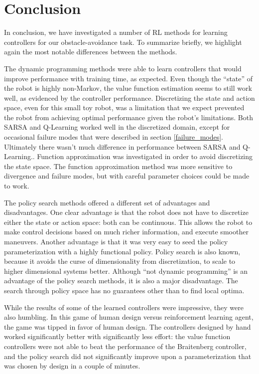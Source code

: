 \documentclass{article}
\begin{document}
\section{Conclusion}

In conclusion, we have investigated a number of RL methods for learning controllers for our obstacle-avoidance task.  To summarize briefly, we highlight again the most notable differences between the methods.

The dynamic programming methods were able to learn controllers that would improve performance with training time, as expected.  Even though the ``state'' of the robot is highly non-Markov, the value function estimation seems to still work well, as evidenced by the controller performance.  Discretizing the state and action space, even for this small toy robot, was a limitation that we expect prevented the robot from achieving optimal performance given the robot's limitations. Both SARSA and Q-Learning worked well in the discretized domain, except for occasional failure modes that were described in section \ref{failure_modes}. Ultimately there wasn't much difference in performance between SARSA and Q-Learning.. Function approximation was investigated in order to avoid discretizing the state space. The function approximation method was more sensitive to divergence and failure modes, but with careful parameter choices could be made to work.

The policy search methods offered a different set of advantages and disadvantages.  One clear advantage is that the robot does not have to discretize either the state or action space: both can be continuous.  This allows the robot to make control decisions based on much richer information, and execute smoother maneuvers.  Another advantage is that it was very easy to seed the policy parameterization with a highly functional policy.  Policy search is also known, because it avoids the curse of dimensionality from discretization, to scale to higher dimensional systems better.  Although ``not dynamic programming'' is an advantage of the policy search methods, it is also a major disadvantage.  The search through policy space has no guarantees other than to find local optima.

While the results of some of the learned controllers were impressive, they were also humbling.  In this game of human design versus reinforcement learning agent, the game was tipped in favor of human design. The controllers designed by hand worked significantly better with significantly less effort:  the value function controllers were not able to beat the performance of the Braitenberg controller, and the policy search did not significantly improve upon a parameterization that was chosen by design in a couple of minutes.
\end{document}
